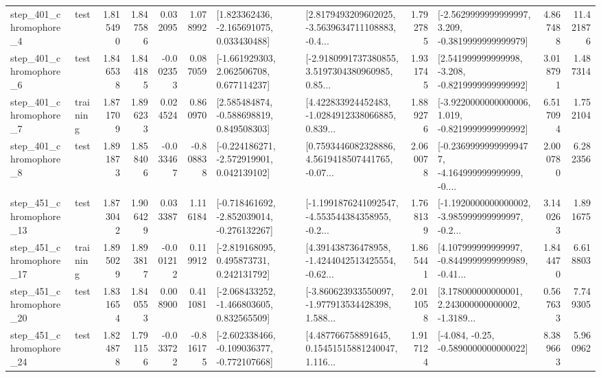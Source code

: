 \begin{tabular}{llrrrrllrlrr}
   step\_401\_chromophore\_4 &      test &      1.815490 &    1.847586 &      0.032095 &  1.078992 &    [1.823362436, -2.165691075, 0.033430488] &  [2.8179493209602025, -3.5639634711108883, -0.4... &       1.792785 &  [-2.5629999999999997, 3.209, -0.3819999999999979] &            4.867488 &         11.421876 \\
   step\_401\_chromophore\_6 &      test &      1.846538 &    1.844185 &     -0.002353 &  0.087059 &    [-1.661929303, 2.062506708, 0.677114237] &  [-2.9180991737380855, 3.5197304380960985, 0.85... &       1.931745 &   [2.541999999999998, -3.208, -0.8219999999999992] &            3.018791 &          1.487314 \\
   step\_401\_chromophore\_7 &  training &      1.871709 &    1.896233 &      0.024524 &  0.860970 &    [2.585484874, -0.588698819, 0.849508303] &  [4.422833924452483, -1.0284912338066885, 0.839... &       1.889276 &  [-3.9220000000000006, 1.019, -0.8219999999999992] &            6.517094 &          1.752104 \\
   step\_401\_chromophore\_8 &      test &      1.891873 &    1.858406 &     -0.033467 & -0.808838 &   [-0.224186271, -2.572919901, 0.042139102] &  [0.7593446082328886, 4.5619418507441765, -0.07... &       2.060078 &  [-0.23699999999999477, -4.164999999999999, -0.... &            2.000780 &          6.282356 \\
  step\_451\_chromophore\_13 &      test &      1.873042 &    1.906429 &      0.033387 &  1.116184 &  [-0.718461692, -2.852039014, -0.276132267] &  [-1.1991876241092547, -4.553544384358955, -0.2... &       1.768139 &  [-1.1920000000000002, -3.985999999999997, -0.2... &            3.140263 &          1.891675 \\
  step\_451\_chromophore\_17 &  training &      1.895029 &    1.893817 &     -0.001212 &  0.119912 &    [-2.819168095, 0.495873731, 0.242131792] &  [4.391438736478958, -1.4244042513425554, -0.62... &       1.865441 &  [4.107999999999997, -0.8449999999999989, -0.41... &            1.844470 &          6.618803 \\
  step\_451\_chromophore\_20 &      test &      1.831654 &    1.840553 &      0.008900 &  0.411081 &   [-2.068433252, -1.466803605, 0.832565509] &  [-3.860623933550097, -1.977913534428398, 1.588... &       2.011058 &  [3.178000000000001, 2.243000000000002, -1.3189... &            0.567633 &          7.749305 \\
  step\_451\_chromophore\_24 &      test &      1.824878 &    1.791156 &     -0.033722 & -0.816175 &  [-2.602338466, -0.109036377, -0.772107668] &  [4.487766758891645, 0.15451515881240047, 1.116... &       1.917124 &               [-4.084, -0.25, -0.5890000000000022] &            8.389663 &          5.960962 \\

\end{tabular}
